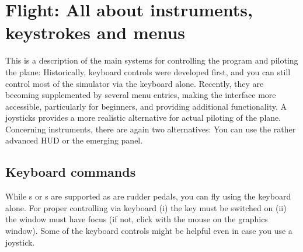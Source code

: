 
\chapter{Flight: All about instruments, keystrokes and menus\label{flight}}

This is a description of the main systems for controlling the program and piloting the
plane: Historically, keyboard controls were developed first, and you can still control
most of the simulator via the keyboard alone. Recently, they are becoming supplemented by
several menu entries, making the interface more accessible, particularly for beginners,
and providing additional functionality. A joysticks provides a more realistic alternative
for actual piloting of the plane. Concerning instruments, there are again two
alternatives: You can use the rather advanced HUD or the emerging panel.

\section{Keyboard commands}

While s or s are supported as are rudder pedals, you can fly
\FlightGear using the keyboard alone. For proper controlling via keyboard (i) the
\texttt{} key must be switched on (ii) the \FlightGear window must have
focus (if not, click with the mouse on the graphics window). Some of the keyboard
controls might be helpful even in case you use a joystick.


